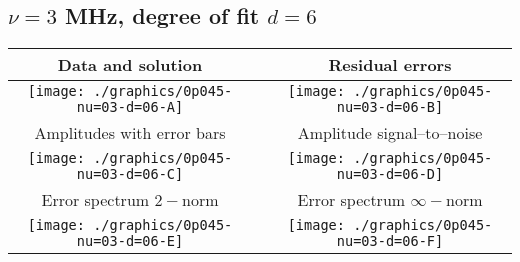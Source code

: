 

% 

\clearpage{}
\break{}

\subsection{$\nu = 3$ MHz, degree of fit $d = 6$}

\begin{table}[h]
    \begin{center}
        \begin{tabular}{ccc}
            Data and solution & \quad & Residual errors \\\hline
            \texttt{[image: ./graphics/0p045-nu=03-d=06-A]} &&
            \texttt{[image: ./graphics/0p045-nu=03-d=06-B]} \\[15pt]
            Amplitudes with error bars && Amplitude signal--to--noise \\\hline
            \texttt{[image: ./graphics/0p045-nu=03-d=06-C]} &&
            \texttt{[image: ./graphics/0p045-nu=03-d=06-D]} \\[15pt]
            Error spectrum $2-$norm && Error spectrum $\infty-$norm \\\hline
            \texttt{[image: ./graphics/0p045-nu=03-d=06-E]} &&
            \texttt{[image: ./graphics/0p045-nu=03-d=06-F]} \\[15pt]
        \end{tabular}
    \end{center}
\label{fig:elev=45, nu=3}
\end{table}



\endinput
